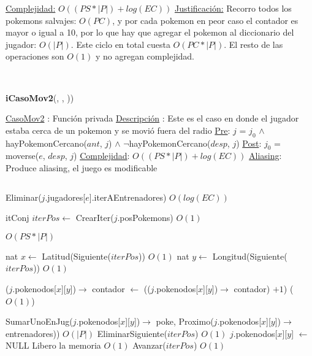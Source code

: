 \begin{Algoritmos}
\begin{algorithmic}[1]
\medskip
\Statex \underline{Complejidad:} $O((PS *|P|) + log(EC))$ 
\Statex \underline{Justificaci\'on:} Recorro todos los pokemons salvajes: $O(PC)$, y por cada pokemon en peor caso el contador es mayor o igual a 10, por lo que hay que agregar el pokemon al diccionario del jugador: $O(|P|)$. Este ciclo en total cuesta $O(PC*|P|)$. El resto de las operaciones son $O(1)$ y no agregan complejidad. 
\end{algorithmic}

$ $\newline
$ $\newline


{\textbf{iCasoMov2}(,  , ))}
\begin{algorithmic}[1]

\Statex \underline{CasoMov2} : Funci\'on privada 
\Statex \underline{Descripci\'on} : Este es el caso en donde el jugador estaba cerca de un pokemon y se movi\'o fuera del radio
\Statex \underline{Pre}: $j$ = $j_0$ $\land$ hayPokemonCercano($ant$, $j$) $\land$ $\neg$hayPokemonCercano($desp$, $j$) 
\Statex \underline{Post}: $j_0$ = moverse($e$, $desp$, $j$) 
\Statex \underline{Complejidad}:  $O((PS *|P|) + log(EC))$ 
\Statex \underline{Aliasing}: Produce aliasing, el juego es modificable

$ $\newline

\State Eliminar($j$.jugadores[$e$].iterAEntrenadores) \Comment $O(log(EC))$

\State itConj $iterPos \gets$ CrearIter($j$.posPokemons) \Comment $O(1)$ 

  \Comment $O(PS * |P|)$

  \State nat $x \gets$ Latitud(Siguiente($iterPos$)) \Comment $O(1)$
  \State nat $y \gets$ Longitud(Siguiente($iterPos$)) \Comment $O(1)$   
  
  \State ($j$.pokenodos[$x$][$y$])$\rightarrow$ contador $\gets$ (($j$.pokenodos[$x$][$y$])$\rightarrow$ contador) $+ 1$) \Comment($O(1)$)
  
    \State SumarUnoEnJug($j$.pokenodos[$x$][$y$])$\rightarrow$ poke, Proximo($j$.pokenodos[$x$][$y$])$\rightarrow$ entrenadores)) \Comment $O(|P|)$
    \State EliminarSiguiente($iterPos$) \Comment $O(1)$
    \State $j$.pokenodos[$x$][$y$] $\gets$ NULL \Comment Libero la memoria $O(1)$
  \Else 
    \State Avanzar($iterPos$) \Comment $O(1)$ 
  \EndIf


\end{algorithmic}
\end{Algoritmos}

